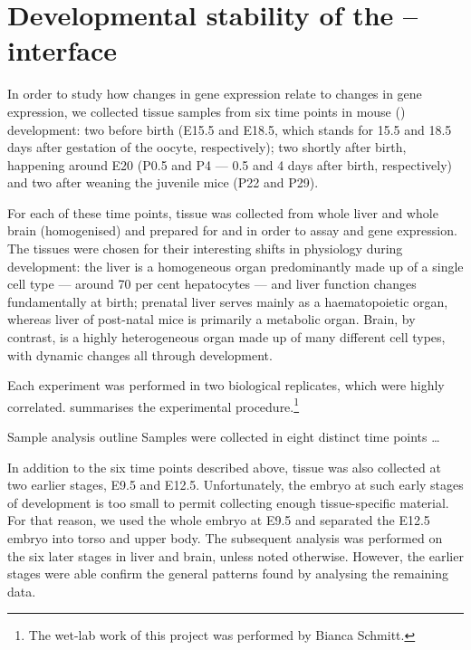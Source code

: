 \chapter{Developmental stability of the -- interface}

In order to study how changes in \mrna gene expression relate to changes in
\trna gene expression, we collected tissue samples from six time points in mouse
(\mmu) development: two before birth (E15.5 and E18.5, which stands for
\num{15.5} and \num{18.5} days after gestation of the oocyte, respectively); two
shortly after birth, happening around E20 (P0.5 and P4 --- \num{0.5} and \num{4}
days after birth, respectively) and two after weaning the juvenile mice (P22 and
P29).

For each of these time points, tissue was collected from whole liver and whole
brain (homogenised) and prepared for \rnaseq and  \chipseq in order to
assay \mrna and \trna gene expression. The tissues were chosen for their
interesting shifts in physiology during development: the liver is a homogeneous
organ predominantly made up of a single cell type --- around \num{70} per cent
hepatocytes\todo[ref]{} --- and liver function changes fundamentally at birth;
prenatal liver serves mainly as a haematopoietic organ, whereas liver of
post-natal mice is primarily a metabolic organ.\todo[ref]{} Brain, by contrast,
is a highly heterogeneous organ made up of many different cell types, with
dynamic changes all through development.\todo[ref]{}

Each experiment was performed in two biological replicates, which were highly
correlated.  summarises the experimental
procedure.\footnote{The wet-lab work of this project was performed by Bianca
Schmitt.}

    {Sample analysis outline}
    {Samples were collected in eight distinct time points …}

In addition to the six time points described above, tissue was also collected at
two earlier stages, E9.5 and E12.5. Unfortunately, the embryo at such early
stages of development is too small to permit collecting enough tissue-specific
material. For that reason, we used the whole embryo at E9.5 and separated the
E12.5 embryo into torso and upper body. The subsequent analysis was performed on
the six later stages in liver and brain, unless noted otherwise. However, the earlier stages were able confirm the general
patterns found by analysing the remaining data.

